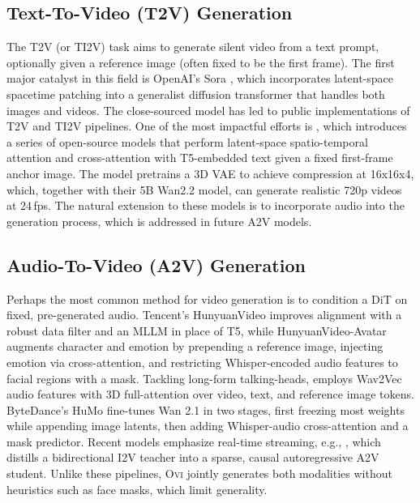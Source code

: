 \documentclass{article} %
\begin{document}
\subsection{Text-To-Video (T2V) Generation}
The T2V (or TI2V) task aims to generate silent video from a text prompt, optionally given a reference image (often fixed to be the first frame). The first major catalyst in this field is OpenAI's Sora \citep{sora}, which incorporates latent-space spacetime patching into a generalist diffusion transformer that handles both images and videos. The close-sourced model has led to public implementations of T2V and TI2V pipelines. One of the most impactful efforts is \citet{wan2025wan}, which introduces a series of open-source models that perform latent-space spatio-temporal attention and cross-attention with T5-embedded text given a fixed first-frame anchor image. The model pretrains a 3D VAE to achieve compression at 16x16x4, which, together with their 5B Wan2.2 model, can generate realistic 720p videos at 24\,fps. The natural extension to these models is to incorporate audio into the generation process, which is addressed in future A2V models.

\subsection{Audio-To-Video (A2V) Generation}
Perhaps the most common method for video generation is to condition a DiT on fixed, pre-generated audio. Tencent’s HunyuanVideo \citep{kong2024hunyuanvideo} improves alignment with a robust data filter and an MLLM in place of T5, while HunyuanVideo-Avatar \citep{chen2025hunyuanvideo} augments character and emotion by prepending a reference image, injecting emotion via cross-attention, and restricting Whisper-encoded audio features to facial regions with a mask. Tackling long-form talking-heads, \citet{yi2025magicinfinite} employs Wav2Vec audio features with 3D full-attention over video, text, and reference image tokens. ByteDance’s HuMo \citep{chen2025humo} fine-tunes Wan 2.1 in two stages, first freezing most weights while appending image latents, then adding Whisper-audio cross-attention and a mask predictor. Recent models emphasize real-time streaming, e.g., \citet{low2025talkingmachines}, which distills a bidirectional I2V teacher into a sparse, causal autoregressive A2V student. Unlike these pipelines, \textsc{Ovi} jointly generates both modalities without heuristics such as face masks, which limit generality.
\end{document}
